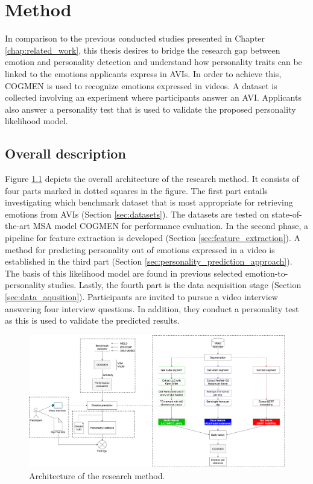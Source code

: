 \chapter{Method}
\label{chap:method}
In comparison to the previous conducted studies presented in Chapter \ref{chap:related_work}, this thesis desires to bridge the research gap between emotion and personality detection and understand how personality traits can be linked to the emotions applicants express in AVIs. In order to achieve this, COGMEN is used to recognize emotions expressed in videos. A dataset is collected involving an experiment where participants answer an AVI. Applicants also answer a personality test that is used to validate the proposed personality likelihood model. 

\section{Overall description}
\label{sec:overall_description}
Figure \ref{fig:research_method} depicts the overall architecture of the research method. It consists of four parts marked in dotted squares in the figure. The first part entails investigating which benchmark dataset that is most appropriate for retrieving emotions from AVIs (Section \ref{sec:datasets}). The datasets are tested on state-of-the-art MSA model COGMEN for performance evaluation. In the second phase, a pipeline for feature extraction is developed (Section \ref{sec:feature_extraction}). A method for predicting personality out of emotions expressed in a video is established in the third part (Section \ref{sec:personality_prediction_approach}). The basis of this likelihood model are found in previous selected emotion-to-personality studies. Lastly, the fourth part is the data acquisition stage (Section \ref{sec:data_aqusition}). Participants are invited to pursue a video interview answering four interview questions. In addition, they conduct a personality test as this is used to validate the predicted results.  
\newpage
\begin{figure}[h]
  \centering
  \includegraphics[width=\textwidth]{figures/new_process.png}
  \caption{Architecture of the research method.}
  \label{fig:research_method}
\end{figure}

